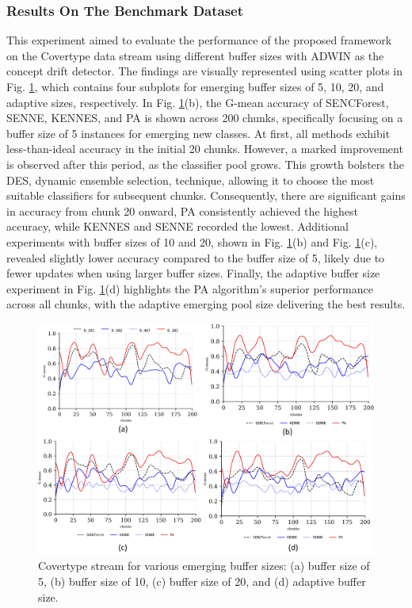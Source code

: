 \subsubsection{Results On The Benchmark Dataset}
\label{sec:covertype}
This experiment aimed to evaluate the performance of the proposed framework on the Covertype data stream using different buffer sizes with ADWIN as the concept drift detector. The findings are visually represented using scatter plots in Fig. \ref{fig:res1}, which contains four subplots for emerging buffer sizes of 5, 10, 20, and adaptive sizes, respectively. In Fig. \ref{fig:res1}(b), the G-mean accuracy of SENCForest, SENNE, KENNES, and PA is shown across 200 chunks, specifically focusing on a buffer size of 5 instances for emerging new classes. At first, all methods exhibit less-than-ideal accuracy in the initial 20 chunks. However, a marked improvement is observed after this period, as the classifier pool grows. This growth bolsters the DES, dynamic ensemble selection, technique, allowing it to choose the most suitable classifiers for subsequent chunks. Consequently, there are significant gains in accuracy from chunk 20 onward, PA consistently achieved the highest accuracy, while KENNES and SENNE recorded the lowest. Additional experiments with buffer sizes of 10 and 20, shown in Fig. \ref{fig:res1}(b) and Fig. \ref{fig:res1}(c), revealed slightly lower accuracy compared to the buffer size of 5, likely due to fewer updates when using larger buffer sizes. Finally, the adaptive buffer size experiment in Fig. \ref{fig:res1}(d) highlights the PA algorithm's superior performance across all chunks, with the adaptive emerging pool size delivering the best results.

\begin{figure}[!ht]
	\centering
	\includegraphics[width=1\linewidth]{5_Emerging/images/res1.png}
	\caption{Covertype stream for various emerging buffer sizes: (a) buffer size of 5, (b) buffer size of 10, (c) buffer size of 20, and (d) adaptive buffer size.}

	\label{fig:res1}
\end{figure}				

